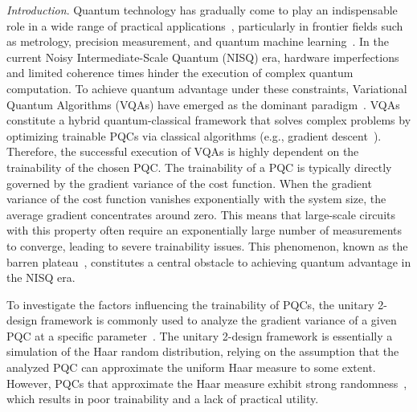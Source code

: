 \documentclass[%
 superscriptaddress,
 aps,prl,
 reprint,
 twocolumn,
 amsmath,amssymb,showpacs,
 bibnotes,
]{revtex4-2}
\begin{document}
\maketitle

\emph{Introduction}.
Quantum technology has gradually come to play an indispensable role in a wide range of practical applications~\cite{daley2022practical, huang2022quantum, bravyi2018quantum, lee2023evaluating, arvidsson2020quantum}, particularly in frontier fields such as metrology, precision measurement, and quantum machine learning~\cite{liu2024optimal,munoz2024photonic,de2025improving,yang2025programmable,haug2022natural,miao2024neural,tilly2022variational,wu2023quantumdarts}. In the current Noisy Intermediate-Scale Quantum (NISQ) era, hardware imperfections and limited coherence times hinder the execution of complex quantum computation. To achieve quantum advantage under these constraints, Variational Quantum Algorithms (VQAs) have emerged as the dominant paradigm~\cite{peruzzo2014variational,farhi2014quantum,mcclean2016theory,o2016scalable,kandala2017hardware,grimsley2019adaptive,endo2020variational,cimini2024variational}. VQAs constitute a hybrid quantum-classical framework that solves complex problems by optimizing trainable PQCs via classical algorithms (e.g., gradient descent~\cite{mitarai2018quantum,schuld2019evaluating}). Therefore, the successful execution of VQAs is highly dependent on the trainability of the chosen PQC. The trainability of a PQC is typically directly governed by the gradient variance of the cost function. When the gradient variance of the cost function vanishes exponentially with the system size, the average gradient concentrates around zero. This means that large-scale circuits with this property often require an exponentially large number of measurements to converge, leading to severe trainability issues. This phenomenon, known as the barren plateau~\cite{mcclean2018barren}, constitutes a central obstacle to achieving quantum advantage in the NISQ era.

To investigate the factors influencing the trainability of PQCs, the unitary 2-design framework is commonly used to analyze the gradient variance of a given PQC at a specific parameter~\cite{ortiz2021entanglement, holmes2022connecting, gong2024enhancing, arrasmith2021effect, qi2023barren, liu2022estimating,cunningham2025investigating}. The unitary 2-design framework is essentially a simulation of the Haar random distribution, relying on the assumption that the analyzed PQC can approximate the uniform Haar measure to some extent. However, PQCs that approximate the Haar measure exhibit strong randomness~\cite{holmes2022connecting}, which results in poor trainability and a lack of practical utility.
\end{document}
